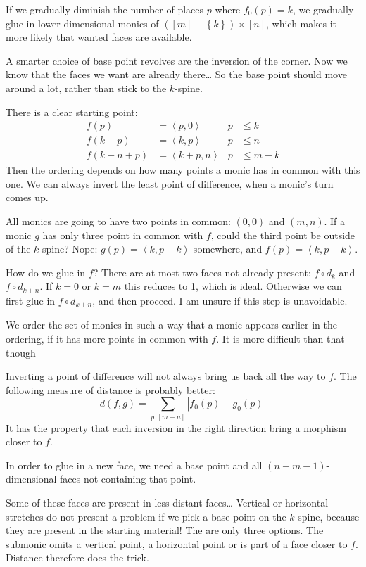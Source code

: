 \documentclass{tac}
\newcommand\set[1]{\left\{#1\right\}}
\newcommand\of{:}
\newcommand\tuplet[1]{\left\langle #1 \right\rangle}
\begin{document}
If we gradually diminish the number of places $p$ where $f_0(p)=k$, we gradually glue in lower dimensional monics of $([m]-\set k)\times [n]$, which makes it more likely that wanted faces are available.

A smarter choice of base point revolves are the inversion of the corner. Now we know that the faces we want are already there\dots
So the base point should move around a lot, rather than stick to the $k$-spine.

There is a clear starting point:
\begin{align*}
f(p) &= \tuplet{p,0} & p&\leq k\\
f(k+p) &= \tuplet{k,p} & p&\leq n\\
f(k+n+p) &= \tuplet{k+p,n} & p&\leq m-k
\end{align*}
Then the ordering depends on how many points a monic has in common with this one. We can always invert the least point of difference, when a monic's turn comes up.

All monics are going to have two points in common: $(0,0)$ and $(m,n)$.
If a monic $g$ has only three point in common with $f$, could the third point be outside of the $k$-spine? 
Nope: $g(p)=\tuplet{k,p-k}$ somewhere, and $f(p)=\tuplet{k,p-k}$.

How do we glue in $f$?
There are at most two faces not already present: $f\circ d_k$ and $f\circ d_{k+n}$. If $k=0$ or $k=m$ this reduces to 1, which is ideal.
Otherwise we can first glue in $f\circ d_{k+n}$, and then proceed. I am unsure if this step is unavoidable.

We order the set of monics in such a way that a monic appears earlier in the ordering, if it has more points in common with $f$.
It is more difficult than that though

Inverting a point of difference will not always bring us back all the way to $f$. 
The following measure of distance is probably better:
\[ d(f,g) = \sum_{p\of[m+n]}| f_0(p)-g_0(p) | \]
It has the property that each inversion in the right direction bring a morphism closer to $f$.

In order to glue in a new face, we need a base point and all $(n+m-1)$-dimensional faces not containing that point.

Some of these faces are present in less distant faces\dots
Vertical or horizontal stretches do not present a problem if we pick a base point on the $k$-spine, because they are present in the starting material!
The are only three options. The submonic omits a vertical point, a horizontal point or is part of a face closer to $f$. Distance therefore does the trick.
\end{document}
